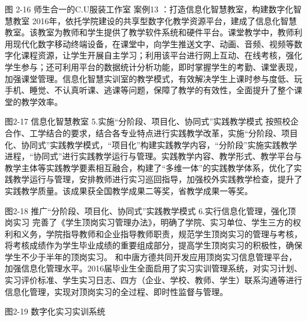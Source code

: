 图 2-16  师生合一的C.U服装工作室
案例13 ：打造信息化智慧教室，构建数字化智慧教室
2016年，依托学院建设的共享型数字化教学资源平台，建成了信息化智慧教室。该教室为教师和学生提供了教学软件系统和硬件平台。课堂教学中，教师利用现代化数字移动终端设备，在课堂中，向学生推送文字、动画、音频、视频等数字化课程资源，让学生开展自主学习；利用该平台进行网上互动、在线考核，强化学生参与；还可利用平台的数据统计分析功能，即时掌握学生的考勤、课堂表现，加强课堂管理。信息化智慧实训室的教学模式，有效解决学生上课时参与度低、玩手机、睡觉、不认真听课、逃课等问题，保障了教学的有效性，全面提升了整个课堂的教学效率。







                                                 
 图2-17  信息化智慧教室
5.实施“分阶段、项目化、协同式”实践教学模式
按照校企合作、工学结合的要求，结合各专业特点进行实践教学改革，实施“分阶段、项目化、协同式”实践教学模式，“项目化”构建实践教学内容，“分阶段”实施实践教学进程，“协同式”进行实践教学运行与管理。实践教学内容、教学形式、教学平台与教学主体等实践教学要素相互融合，构建了“多维一体”的实践教学体系，优化了实践教学运行与管理，安排教师进行实习巡回指导，加强校外实践教学检查，提升了实践教学质量。该成果获全国教学成果二等奖，省教学成果一等奖。

图2-18 推广“分阶段、项目化、协同式”实践教学模式
6.实行信息化管理，强化顶岗实习
完善了《学生顶岗实习管理办法》，明确了学院、实习单位、学生三方的权利和义务，学院指导教师和企业指导教师职责，规范学生顶岗实习的管理与考核，将考核成绩作为学生毕业成绩的重要组成部分，提高学生顶岗实习的积极性，确保学生不少于半年的顶岗实习。
和中唐方德共同开发应用顶岗实习信息管理平台，加强信息化管理水平。2016届毕业生全面启用了实习实训管理系统，对实习计划、实习评价标准、学生实习日志、四方（企业、学校、教师、学生）联系沟通等进行信息化管理，实现对顶岗实习的全过程、即时性监督与管理。

图2-19  数字化实习实训系统

